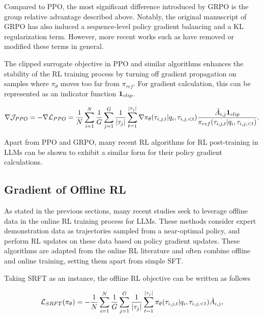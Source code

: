 Compared to PPO, the most significant difference introduced by GRPO is the group relative advantage described above. Notably, the original manuscript of GRPO has also induced a sequence-level policy gradient balancing and a KL regularization term. However, more recent works such as \citep{yu2025dapo} have removed or modified these terms in general.

The clipped surrogate objective in PPO and similar algorithms enhances the stability of the RL training process by turning off gradient propagation on samples where $\pi_\theta$ moves too far from $\pi_{ref}$. For gradient calculation, this can be represented as an indicator function $\mathbf{1}_{clip}$. 

\begin{equation}\label{eq_PPO_grad}
    \nabla \mathcal{J}_{PPO} = -\nabla \mathcal{L}_{PPO} =     \frac{1}{N}\sum_{i=1}^N \frac{1}{G}\sum_{j=1}^G \frac{1}{|\tau_j|} \sum_{t=1}^{|\tau_j|} 
    \nabla \pi_\theta (\tau_{i,j,t} |q_i, \tau_{i,j, <t} )  \frac{\hat{A}_{i,j} \mathbf{1}_{clip}}{\pi_{ref} (\tau_{i,j,t} |q_i, \tau_{i,j, <t} )} .
\end{equation}

Apart from PPO and GRPO, many recent RL algorithms for RL post-training in LLMs can be shown to exhibit a similar form for their policy gradient calculations.


\subsection{Gradient of Offline RL}

As stated in the previous sections, many recent studies seek to leverage offline data in the online RL training process for LLMs.
These methods consider expert demonstration data as trajectories sampled from a near-optimal policy, and perform RL updates on these data based on policy gradient updates. These algorithms are adapted from the online RL literature and often combine offline and online training, setting them apart from simple SFT.

Taking SRFT \citep{fu2025srft} as an instance, the offline RL objective can be written as follows

\begin{equation}\label{eq_SRFT_loss}
    \mathcal{L}_{SRFT}(\pi_\theta) = 
    - \frac{1}{N}\sum_{i=1}^N \frac{1}{G}\sum_{j=1}^G \frac{1}{|\tau_j|} \sum_{t=1}^{|\tau_j|} 
        \pi_\theta (\tau_{i,j,t} |q_i, \tau_{i,j, <t} )  \hat{A}_{i,j},
\end{equation}


